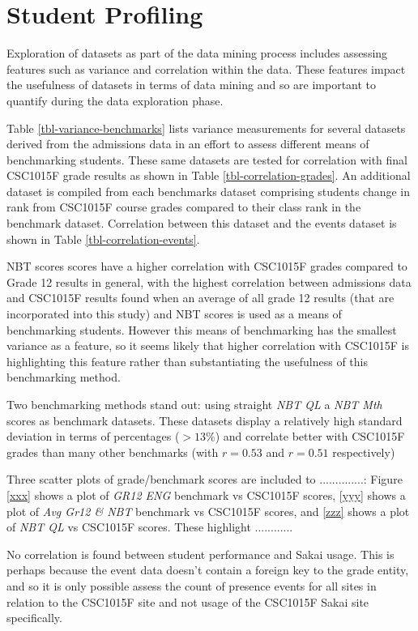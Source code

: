 

\section{Student Profiling}
Exploration of datasets as part of the data mining process includes assessing features such as variance and correlation within the data. These features impact the usefulness of datasets in terms of data mining and so are important to quantify during the data exploration phase.

Table \ref{tbl-variance-benchmarks} lists variance measurements for several datasets derived from the admissions data in an effort to assess different means of benchmarking students. These same datasets are tested for correlation with final CSC1015F grade results as shown in Table \ref{tbl-correlation-grades}. An additional dataset is compiled from each benchmarks dataset comprising students change in rank from CSC1015F course grades compared to their class rank in the benchmark dataset. Correlation between this dataset and the events dataset is shown in Table \ref{tbl-correlation-events}.

NBT scores scores have a higher correlation with CSC1015F grades compared to Grade 12 results in general, with the highest correlation between admissions data and CSC1015F results found when an average of all grade 12 results (that are incorporated into this study) and NBT scores is used as a means of benchmarking students. However this means of benchmarking has the smallest variance as a feature, so it seems likely that higher correlation with CSC1015F is highlighting this feature rather than substantiating the usefulness of this benchmarking method.

Two benchmarking methods stand out: using straight \textit{NBT QL} a \textit{NBT Mth} scores as benchmark datasets. These datasets display a relatively high standard deviation in terms of percentages ($> 13\%$) and correlate better with CSC1015F grades than many other benchmarks (with $r = 0.53$ and $r = 0.51$ respectively)

Three scatter plots of grade/benchmark scores are included to ..............: Figure \ref{xxx} shows a plot of \textit{GR12 ENG} benchmark vs CSC1015F scores, \ref{yyy} shows a plot of \textit{Avg Gr12 \& NBT} benchmark vs CSC1015F scores, and \ref{zzz} shows a plot of \textit{NBT QL} vs CSC1015F scores. These highlight ............

No correlation is found between student performance and Sakai usage. This is perhaps because the event data doesn't contain a foreign key to the grade entity, and so it is only possible assess the count of presence events for all sites in relation to the CSC1015F site and not usage of the CSC1015F Sakai site specifically.







